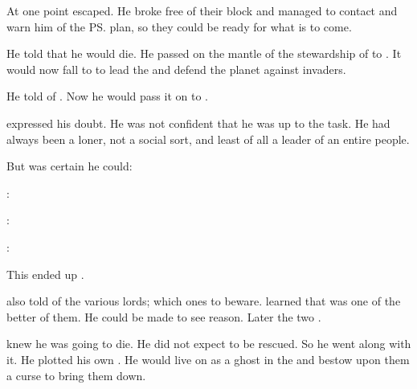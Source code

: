 At one point \Nexagglachel{} escaped. 
He broke free of their block and managed to contact \Ishnaruchaefir{} and warn him of the \ps{\resphain} plan, so they could be ready for what is to come. 

He told \Ishnaruchaefir{} that he would die. 
He passed on the mantle of the stewardship of \Miith{} to \Ishnaruchaefir. 
It would now fall to \Ishnaruchaefir{} to lead the \dragons{} and defend the planet against invaders. 

He told \Ishnaruchaefir{} of . 
Now he would pass it on to \Ishnaruchaefir. 

\Ishnaruchaefir{} expressed his doubt. 
He was not confident that he was up to the task. 
He had always been a loner, not a social sort, and least of all a leader of an entire people. 

But \Nexagglachel{} was certain he could: 
\begin{prose}
  \Ishnaruchaefir: 
  
  \Nexagglachel: 
  
  \Ishnaruchaefir:
\end{prose}

This ended up . 

\Nexagglachel also told \Ishnaruchaefir of the various \resphan lords; which ones to beware. 
\Ishnaruchaefir learned that \Azraid was one of the better of them. 
He could be made to see reason. 
Later the two .

\Nexagglachel{} knew he was going to die. 
He did not expect to be rescued. 
So he went along with it. 
He plotted his own \XanatosGambit. 
He would live on as a ghost in the \satharioth{} and bestow upon them a curse to bring them down. 

